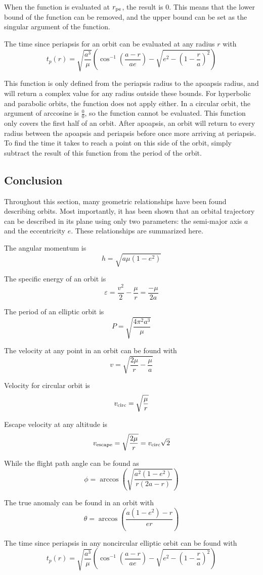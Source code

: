 \documentclass[../basicOrbitalDynamics.tex]{subfiles}
\begin{document}
When the function is evaluated at ${r}_\text{pe}$, the result is $0$. This means that the lower bound of the function can be removed, and the upper bound can be set as the singular argument of the function.

The time since periapsis for an orbit can be evaluated at any radius $r$ with
\begin{equation}\label{Time since periapsis}
    t_p(r)=\sqrt{\frac{a^3}{\mu}}\left(\cos^{-1}\left(\frac{a-r}{ae}\right)- \sqrt{e^2-\left(1-\frac{r}{a}\right)^2}\right)
\end{equation}

This function is only defined from the periapsis radius to the apoapsis radius, and will return a complex value for any radius outside these bounds. For hyperbolic and parabolic orbits, the function does not apply either. In a circular orbit, the argument of arccosine is $\frac{0}{0}$, so the function cannot be evaluated. This function only covers the first half of an orbit. After apoapsis, an orbit will return to every radius between the apoapsis and periapsis before once more arriving at periapsis. To find the time it takes to reach a point on this side of the orbit, simply subtract the result of this function from the period of the orbit.

\bigskip\bigskip
\subsection{Conclusion}

Throughout this section, many geometric relationships have been found describing orbits. Most importantly, it has been shown that an orbital trajectory can be described in its plane using only two parameters: the semi-major axis $a$ and the eccentricity $e$. These relationships are summarized here.

\bigskip
The angular momentum is
\[h=\sqrt{a\mu(1-e^2)}\]

\bigskip
The specific energy of an orbit is
\[\varepsilon=\frac{v^2}{2}-\frac{\mu}{r}=\frac{-\mu}{2a}\]

\bigskip
The period of an elliptic orbit is
\[P=\sqrt{\frac{4\pi^2a^3}{\mu}}\]

\bigskip
The velocity at any point in an orbit can be found with
\[v=\sqrt{\frac{2\mu}{r}-\frac{\mu}{a}}\]

Velocity for circular orbit is
\[{v}_\text{circ}=\sqrt{\frac{\mu}{r}}\]

Escape velocity at any altitude is
\[{v}_\text{escape}=\sqrt{\frac{2\mu}{r}}={v}_\text{circ}\sqrt{2}\]

\bigskip
While the flight path angle can be found as
\[\phi=\arccos\left(\sqrt{\frac{a^2(1-e^2)}{r(2a-r)}}\right)\]

\bigskip
The true anomaly can be found in an orbit with
\[\theta=\arccos\left(\frac{a(1-e^2)-r}{er}\right)\]

\bigskip
The time since periapsis in any noncircular elliptic orbit can be found with
\[t_p(r)=\sqrt{\frac{a^3}{\mu}}\left(\cos^{-1}\left(\frac{a-r}{ae}\right)- \sqrt{e^2-\left(1-\frac{r}{a}\right)^2}\right)\]
\end{document}
